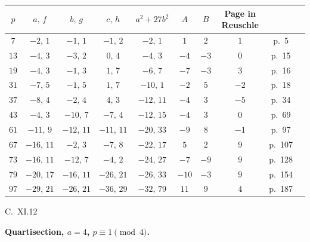 \documentclass[11pt]{article}
\begin{document}
\begin{center}
\renewcommand{\arraystretch}{1.25}
\begin{tabular}{|c|ccc|ccc|c|c|c|}
\hline
$p$ & $a,\,f$ & $b,\,g$ & $c,\,h$ & $a^2 + 27b^2$ & $A$ & $B$ & Page in Reuschle \\
\hline
$7$  & $-2,\,1$ & $-1,\,1$ & $-1,\,2$ & $-2,\,1$ & $1$ & $2$ & $1$ & p.~5 \\
$13$ & $-4,\,3$ & $-3,\,2$ & $0,\,4$ & $-4,\,3$ & $-4$ & $-3$ & $0$ & p.~15 \\
$19$ & $-4,\,3$ & $-1,\,3$ & $1,\,7$ & $-6,\,7$ & $-7$ & $-3$ & $3$ & p.~16 \\
$31$ & $-7,\,5$ & $-1,\,5$ & $1,\,7$ & $-10,\,1$ & $-2$ & $5$ & $-2$ & p.~18 \\
$37$ & $-8,\,4$ & $-2,\,4$ & $4,\,3$ & $-12,\,11$ & $-4$ & $3$ & $-5$ & p.~34 \\
$43$ & $-4,\,3$ & $-10,\,7$ & $-7,\,4$ & $-12,\,15$ & $-4$ & $3$ & $0$ & p.~69 \\
$61$ & $-11,\,9$ & $-12,\,11$ & $-11,\,11$ & $-20,\,33$ & $-9$ & $8$ & $-1$ & p.~97 \\
$67$ & $-16,\,11$ & $-2,\,3$ & $-7,\,8$ & $-22,\,17$ & $5$ & $2$ & $9$ & p.~107 \\
$73$ & $-16,\,11$ & $-12,\,7$ & $-4,\,2$ & $-24,\,27$ & $-7$ & $-9$ & $9$ & p.~128 \\
$79$ & $-20,\,17$ & $-16,\,11$ & $-26,\,21$ & $-26,\,33$ & $-10$ & $-3$ & $9$ & p.~154 \\
$97$ & $-29,\,21$ & $-26,\,21$ & $-36,\,29$ & $-32,\,79$ & $11$ & $9$ & $4$ & p.~187 \\
\hline
\end{tabular}
\end{center}

\medskip

C.\ XI.\hfill 12

\newpage

\begin{center}\textbf{Quartisection, $a = 4$, $p \equiv 1 \pmod 4$.}\end{center}

\medskip
\end{document}
